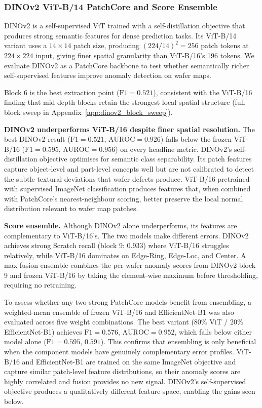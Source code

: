 \documentclass[11pt]{article}
\begin{document}
\subsubsection{DINOv2 ViT-B/14 PatchCore and Score Ensemble}

DINOv2 \cite{oquab2023dinov2} is a self-supervised ViT trained with a self-distillation objective that produces strong semantic features for dense prediction tasks. Its ViT-B/14 variant uses a $14\!\times\!14$ patch size, producing $(224/14)^2 = 256$ patch tokens at $224\!\times\!224$ input, giving finer spatial granularity than ViT-B/16's 196 tokens. We evaluate DINOv2 as a PatchCore backbone to test whether semantically richer self-supervised features improve anomaly detection on wafer maps.

Block 6 is the best extraction point ($\mathrm{F1}=0.521$), consistent with the ViT-B/16 finding that mid-depth blocks retain the strongest local spatial structure (full block sweep in Appendix~\ref{app:dinov2_block_sweep}).

\textbf{DINOv2 underperforms ViT-B/16 despite finer spatial resolution.}
The best DINOv2 result ($\mathrm{F1}=0.521$, $\mathrm{AUROC}=0.926$) falls below the frozen ViT-B/16 ($\mathrm{F1}=0.595$, $\mathrm{AUROC}=0.956$) on every headline metric. DINOv2's self-distillation objective optimises for semantic class separability. Its patch features capture object-level and part-level concepts well but are not calibrated to detect the subtle textural deviations that wafer defects produce. ViT-B/16 pretrained with supervised ImageNet classification produces features that, when combined with PatchCore's nearest-neighbour scoring, better preserve the local normal distribution relevant to wafer map patches.

\textbf{Score ensemble.}
Although DINOv2 alone underperforms, its features are complementary to ViT-B/16's. The two models make different errors. DINOv2 achieves strong Scratch recall (block 9: 0.933) where ViT-B/16 struggles relatively, while ViT-B/16 dominates on Edge-Ring, Edge-Loc, and Center. A max-fusion ensemble combines the per-wafer anomaly scores from DINOv2 block-9 and frozen ViT-B/16 by taking the element-wise maximum before thresholding, requiring no retraining.

To assess whether any two strong PatchCore models benefit from ensembling, a weighted-mean ensemble of frozen ViT-B/16 and EfficientNet-B1 was also evaluated across five weight combinations. The best variant (80\% ViT / 20\% EfficientNet-B1) achieves $\mathrm{F1}=0.576$, $\mathrm{AUROC}=0.952$, which falls below either model alone ($\mathrm{F1}=0.595$, $0.591$). This confirms that ensembling is only beneficial when the component models have genuinely complementary error profiles. ViT-B/16 and EfficientNet-B1 are trained on the same ImageNet objective and capture similar patch-level feature distributions, so their anomaly scores are highly correlated and fusion provides no new signal. DINOv2's self-supervised objective produces a qualitatively different feature space, enabling the gains seen below.
\end{document}
